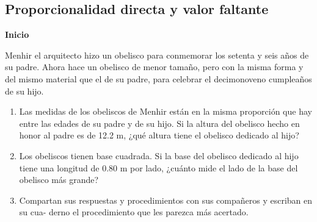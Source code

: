 \documentclass[11pt]{book}
\begin{document}
\subsection{Proporcionalidad directa y valor faltante}
\begin{boxK}
  \begin{center}\textbf{Inicio}\end{center}
  Menhir el arquitecto hizo un obelisco para conmemorar los setenta y seis años de su padre.
  Ahora hace un obelisco de menor tamaño, pero con la misma forma y del mismo material
  que el de su padre, para celebrar el decimonoveno cumpleaños de su hijo.
  \begin{enumerate}
    \item Las medidas de los obeliscos de Menhir están en la misma proporción que hay entre las
          edades de su padre y de su hijo. Si la altura del obelisco hecho en honor al padre es de
          12.2 m, ¿qué altura tiene el obelisco dedicado al hijo?

    \item Los obeliscos tienen base cuadrada. Si la base del obelisco dedicado al hijo tiene una
          longitud de 0.80 m por lado, ¿cuánto mide el lado de la base del obelisco más grande?
    \item Compartan sus respuestas y procedimientos con sus compañeros y escriban en su cua-
          derno el procedimiento que les parezca más acertado.
  \end{enumerate}
\end{boxK}
\end{document}
